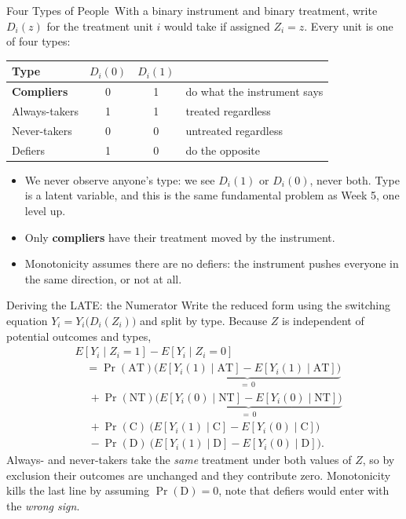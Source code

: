 \documentclass[aspectratio=169,11pt,xcolor=dvipsnames]{beamer}
\newcommand{\E}{E}
\newcommand{\core}{\,\raisebox{0.6pt}{\textcolor{corestar}{$\bigstar$}}}
\begin{document}
\begin{frame}[allowframebreaks,t]{Four Types of People\core}
With a binary instrument and binary treatment, write $D_i(z)$ for the treatment
unit $i$ would take if assigned $Z_i = z$. Every unit is one of four types:
\begin{center}\small
\renewcommand{\arraystretch}{1.25}
\begin{tabular}{lccl}
\toprule
Type & $D_i(0)$ & $D_i(1)$ & \\
\midrule
\textbf{Compliers} & 0 & 1 & do what the instrument says \\
Always-takers & 1 & 1 & treated regardless \\
Never-takers & 0 & 0 & untreated regardless \\
\alert{Defiers} & 1 & 0 & do the opposite \\
\bottomrule
\end{tabular}
\end{center}
\vskip4pt
\begin{itemize}\itemsep2pt
  \item We never observe anyone's type: we see $D_i(1)$ or $D_i(0)$, never both.
        Type is a latent variable, and this is the same fundamental problem as
        Week 5, one level up.
  \item Only \textbf{compliers} have their treatment moved by the instrument.
  \item \alert{Monotonicity} assumes there are no defiers: the instrument pushes
        everyone in the same direction, or not at all.
\end{itemize}
\end{frame}

\begin{frame}{Deriving the LATE: the Numerator}
Write the reduced form using the switching equation
$Y_i = Y_i\big(D_i(Z_i)\big)$ and split by type. Because $Z$ is independent of
potential outcomes and types,
\begin{align*}
  &\E[Y_i\mid Z_i=1] - \E[Y_i\mid Z_i=0] \\
  &\quad= \Pr(\text{AT})\underbrace{\big(\E[Y_i(1)\mid \text{AT}] - \E[Y_i(1)\mid \text{AT}]\big)}_{=\,0} \\
  &\quad\ + \Pr(\text{NT})\underbrace{\big(\E[Y_i(0)\mid \text{NT}] - \E[Y_i(0)\mid \text{NT}]\big)}_{=\,0} \\
  &\quad\ + \Pr(\text{C})\ \big(\E[Y_i(1)\mid \text{C}] - \E[Y_i(0)\mid \text{C}]\big) \\
  &\quad\ - \Pr(\text{D})\ \big(\E[Y_i(1)\mid \text{D}] - \E[Y_i(0)\mid \text{D}]\big) .
\end{align*}
\vskip2pt
Always- and never-takers take the \emph{same} treatment under both values of
$Z$, so \alert{by exclusion} their outcomes are unchanged and they contribute
zero. \alert{Monotonicity} kills the last line by assuming $\Pr(\text{D})=0$, 
note that defiers would enter with the \emph{wrong sign}.
\end{frame}
\end{document}
